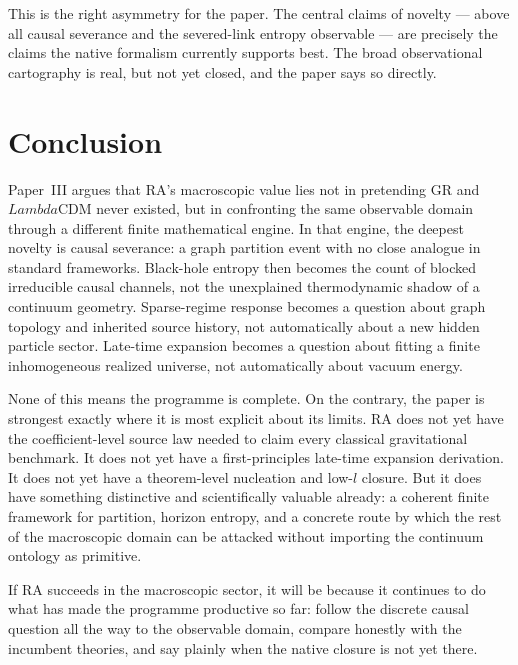 \documentclass[11pt]{article}
\def\ell{l}%
\def\Lambda{Lambda}%
\begin{document}
This is the right asymmetry for the paper. The central claims of novelty --- above all causal severance and the severed-link entropy observable --- are precisely the claims the native formalism currently supports best. The broad observational cartography is real, but not yet closed, and the paper says so directly.

\section{Conclusion}

Paper~III argues that RA's macroscopic value lies not in pretending GR and $\Lambda$CDM never existed, but in confronting the same observable domain through a different finite mathematical engine. In that engine, the deepest novelty is causal severance: a graph partition event with no close analogue in standard frameworks. Black-hole entropy then becomes the count of blocked irreducible causal channels, not the unexplained thermodynamic shadow of a continuum geometry. Sparse-regime response becomes a question about graph topology and inherited source history, not automatically about a new hidden particle sector. Late-time expansion becomes a question about fitting a finite inhomogeneous realized universe, not automatically about vacuum energy.

None of this means the programme is complete. On the contrary, the paper is strongest exactly where it is most explicit about its limits. RA does not yet have the coefficient-level source law needed to claim every classical gravitational benchmark. It does not yet have a first-principles late-time expansion derivation. It does not yet have a theorem-level nucleation and low-$\ell$ closure. But it does have something distinctive and scientifically valuable already: a coherent finite framework for partition, horizon entropy, and a concrete route by which the rest of the macroscopic domain can be attacked without importing the continuum ontology as primitive.

If RA succeeds in the macroscopic sector, it will be because it continues to do what has made the programme productive so far: follow the discrete causal question all the way to the observable domain, compare honestly with the incumbent theories, and say plainly when the native closure is not yet there.

\end{document}
